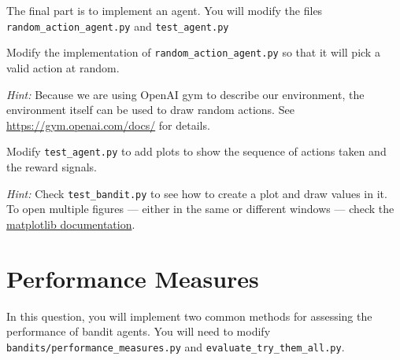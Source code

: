 \documentclass[twoside]{ucl_exam}
\begin{document}
\begin{question}

The final part is to implement an agent. You will modify the files
\texttt{random\_action\_agent.py} and \texttt{test\_agent.py}

\begin{subquestion}

Modify the implementation of \texttt{random\_action\_agent.py} so that it will
pick a valid action at random.

\emph{Hint:} Because we are using OpenAI gym to describe our environment, the
environment itself can be used to draw random actions. See
\url{https://gym.openai.com/docs/} for details.

\end{subquestion}

\begin{subquestion}

Modify \texttt{test\_agent.py} to add plots to show the sequence of actions
taken and the reward signals.

\emph{Hint:} Check \texttt{test\_bandit.py} to see how to create a
plot and draw values in it. To open multiple figures --- either in the
same or different windows --- check the
\href{https://matplotlib.org/stable/gallery/subplots_axes_and_figures/multiple_figs_demo.html}{matplotlib
  documentation}.

\end{subquestion}

\end{question}

\section*{Performance Measures}

In this question, you will implement two common methods for assessing
the performance of bandit agents. You will need to modify
\texttt{bandits/performance\_measures.py} and
\texttt{evaluate\_try\_them\_all.py}.
\end{document}
